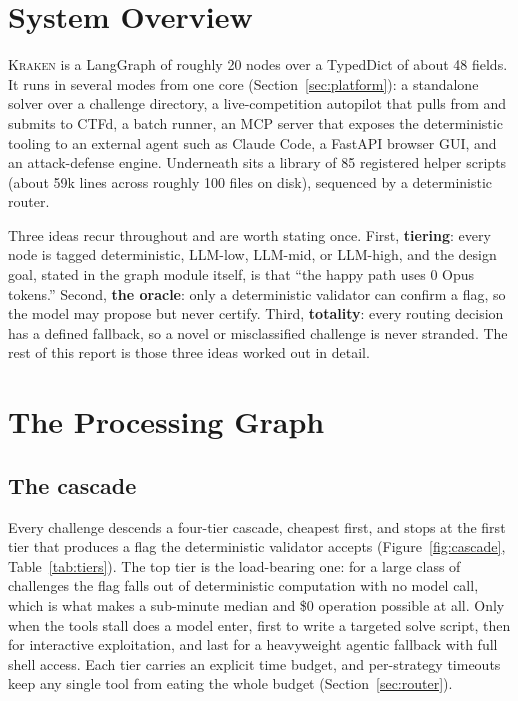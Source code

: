 \documentclass[10pt,twocolumn]{article}
\newcommand{\kraken}{\textsc{Kraken}}
\newcommand{\code}[1]{\seqsplit{\texttt{#1}}}
\begin{document}
\section{System Overview}
\label{sec:overview}

\kraken{} is a LangGraph \code{StateGraph} of roughly 20 nodes over a \code{KrakenState} TypedDict of
about 48 fields. It runs in several modes from one core (Section~\ref{sec:platform}): a standalone
solver over a challenge directory, a live-competition autopilot that pulls from and submits to CTFd, a
batch \code{solve-all} runner, an MCP server that exposes the deterministic tooling to an external
agent such as Claude Code, a FastAPI browser GUI, and an attack-defense engine. Underneath sits a
library of 85 registered helper scripts (about 59k lines across roughly 100 files on disk), sequenced
by a deterministic router.

Three ideas recur throughout and are worth stating once. First, \textbf{tiering}: every node is
tagged deterministic, LLM-low, LLM-mid, or LLM-high, and the design goal, stated in the graph module
itself, is that ``the happy path uses 0 Opus tokens.'' Second, \textbf{the oracle}: only a
deterministic validator can confirm a flag, so the model may propose but never certify. Third,
\textbf{totality}: every routing decision has a defined fallback, so a novel or misclassified
challenge is never stranded. The rest of this report is those three ideas worked out in detail.

\section{The Processing Graph}
\label{sec:graph}

\subsection{The cascade}

Every challenge descends a four-tier cascade, cheapest first, and stops at the first tier that
produces a flag the deterministic validator accepts (Figure~\ref{fig:cascade}, Table~\ref{tab:tiers}).
The top tier is the load-bearing one: for a large class of challenges the flag falls out of
deterministic computation with no model call, which is what makes a sub-minute median and \$0
operation possible at all. Only when the tools stall does a model enter, first to write a targeted
solve script, then for interactive exploitation, and last for a heavyweight agentic fallback with full
shell access. Each tier carries an explicit time budget, and per-strategy timeouts keep any single
tool from eating the whole budget (Section~\ref{sec:router}).
\end{document}

